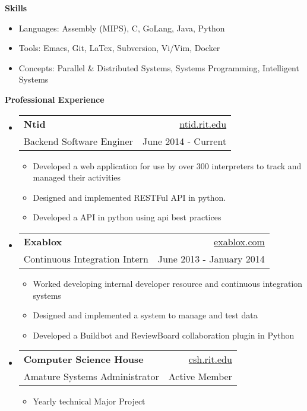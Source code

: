 \documentclass[letterpaper,11pt]{article}
\makeatletter
\newcommand{\resheading}[1]{{\large \colorbox{mygrey}{\begin{minipage}{\textwidth}{\textbf{#1 \vphantom{p\^{E}}}}\end{minipage}}}}
\newcommand{\ressubheading}[4]{
\begin{tabular*}{6.5in}{l@{\extracolsep{\fill}}r}
		\textbf{#1} & #2 \\
		{#3} & {#4} \\
\end{tabular*}\vspace{-6pt}}
\makeatother
\begin{document}
\resheading{{Skills}}
{ \footnotesize
		\begin{itemize}
			\item{Languages: Assembly (MIPS), C, GoLang, Java, Python}
			\item{Tools: Emacs, Git, LaTex, Subversion, Vi/Vim, Docker}
			\item{Concepts: Parallel \& Distributed Systems, Systems Programming, Intelligent Systems}
		\end{itemize}
}
\resheading{Professional Experience}
{\footnotesize
	\begin{itemize}
               \item
                        \ressubheading{Ntid}{\href{http://www.ntid.rit.edu/}{ntid.rit.edu}}{Backend Software Enginer}{June 2014 - Current}
                        { \footnotesize
                                \begin{itemize}
                                  \item{Developed a web application for use by over 300 interpreters to track and managed their activities}
                                  \item{Designed and implemented RESTFul API in python. }
                                  \item{Developed a API in python using api best practices}
                                \end{itemize}
                        }


	       \item
			\ressubheading{Exablox}{\href{http://www.exablox.com/}{exablox.com}}{Continuous Integration Intern}{June 2013 - January 2014}
			{ \footnotesize
				\begin{itemize}
                                  \item{Worked developing internal developer resource and continuous integration systems}
				  \item{Designed and implemented a system to manage and  test data}
				  \item{Developed a Buildbot and ReviewBoard collaboration plugin in Python}
				\end{itemize}
			}
		\item	
			\ressubheading{Computer Science House}{\href{http://www.csh.rit.edu/}{csh.rit.edu}}{Amature Systems Administrator}{Active Member} 
			{ \footnotesize
				\begin{itemize}		
					\item{Yearly technical Major Project}
				\end{itemize}
			}		
	\end{itemize}  %
}
\end{document}
